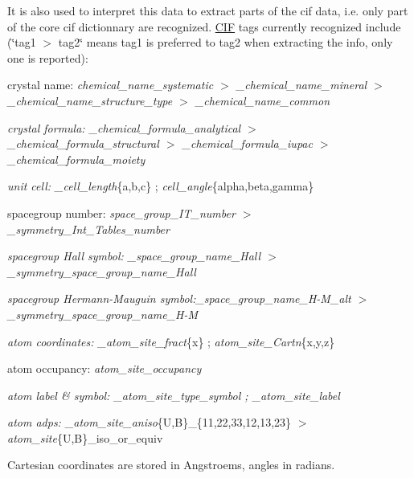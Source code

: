 It is also used to interpret this data to extract parts of the cif data, i.\+e. only part of the core cif dictionnary are recognized. \mbox{\hyperlink{class_obj_cryst_1_1_c_i_f}{C\+IF}} tags currently recognized include (\char`\"{}tag1 $>$ tag2\char`\"{} means tag1 is preferred to tag2 when extracting the info, only one is reported)\+:
\begin{DoxyItemize}
\item crystal name\+: {\itshape chemical\+\_\+name\+\_\+systematic $>$ \+\_\+chemical\+\_\+name\+\_\+mineral $>$ \+\_\+chemical\+\_\+name\+\_\+structure\+\_\+type $>$ \+\_\+chemical\+\_\+name\+\_\+common}
\item {\itshape crystal formula\+: \+\_\+chemical\+\_\+formula\+\_\+analytical $>$ \+\_\+chemical\+\_\+formula\+\_\+structural $>$ \+\_\+chemical\+\_\+formula\+\_\+iupac $>$ \+\_\+chemical\+\_\+formula\+\_\+moiety}
\item {\itshape unit cell\+: \+\_\+cell\+\_\+length}\{a,b,c\} ; {\itshape cell\+\_\+angle}\{alpha,beta,gamma\}
\item spacegroup number\+: {\itshape space\+\_\+group\+\_\+\+I\+T\+\_\+number $>$ \+\_\+symmetry\+\_\+\+Int\+\_\+\+Tables\+\_\+number}
\item {\itshape spacegroup Hall symbol\+: \+\_\+space\+\_\+group\+\_\+name\+\_\+\+Hall $>$ \+\_\+symmetry\+\_\+space\+\_\+group\+\_\+name\+\_\+\+Hall}
\item {\itshape spacegroup Hermann-\/\+Mauguin symbol\+:\+\_\+space\+\_\+group\+\_\+name\+\_\+\+H-\/\+M\+\_\+alt $>$ \+\_\+symmetry\+\_\+space\+\_\+group\+\_\+name\+\_\+\+H-\/M}
\item {\itshape atom coordinates\+: \+\_\+atom\+\_\+site\+\_\+fract}\{x\} ; {\itshape atom\+\_\+site\+\_\+\+Cartn}\{x,y,z\}
\item atom occupancy\+: {\itshape atom\+\_\+site\+\_\+occupancy}
\item {\itshape atom label \& symbol\+: \+\_\+atom\+\_\+site\+\_\+type\+\_\+symbol ; \+\_\+atom\+\_\+site\+\_\+label}
\item {\itshape atom adps\+: \+\_\+atom\+\_\+site\+\_\+aniso}\{U,B\}\+\_\+\{11,22,33,12,13,23\} $>$ {\itshape atom\+\_\+site}\{U,B\}\+\_\+iso\+\_\+or\+\_\+equiv
\end{DoxyItemize}

Cartesian coordinates are stored in Angstroems, angles in radians.

